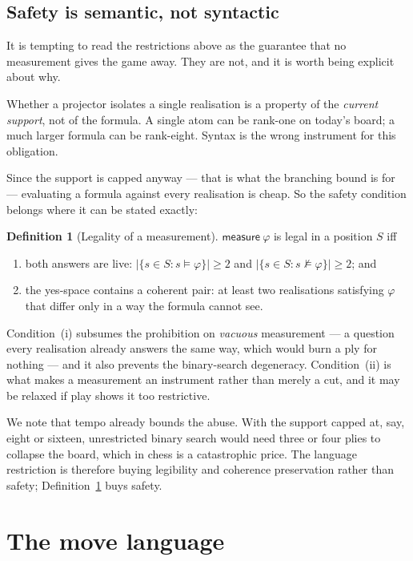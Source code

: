 \documentclass[11pt,a4paper]{article}
\theoremstyle{definition}
\newtheorem{definition}{Definition}[section]
\theoremstyle{plain}
\newcommand{\Meas}{\textsf{measure}}
\begin{document}
\subsection{Safety is semantic, not syntactic}
\label{sec:obs:safety}

It is tempting to read the restrictions above as the guarantee that no
measurement gives the game away. They are not, and it is worth being explicit
about why.

Whether a projector isolates a single realisation is a property of the
\emph{current support}, not of the formula. A single atom can be rank-one on
today's board; a much larger formula can be rank-eight. Syntax is the wrong
instrument for this obligation.

Since the support is capped anyway --- that is what the branching bound is for
--- evaluating a formula against every realisation is cheap. So the safety
condition belongs where it can be stated exactly:

\begin{definition}[Legality of a measurement]
\label{def:meas-legal}
$\Meas\ \varphi$ is legal in a position $S$ iff
\begin{enumerate}[label=(\roman*),leftmargin=2em]
\item both answers are live: $|\{s\in S: s\models\varphi\}|\ge 2$ and
      $|\{s\in S: s\not\models\varphi\}|\ge 2$; and
\item the yes-space contains a coherent pair: at least two realisations
      satisfying $\varphi$ that differ only in a way the formula cannot see.
\end{enumerate}
\end{definition}

Condition~(i) subsumes the prohibition on \emph{vacuous} measurement --- a
question every realisation already answers the same way, which would burn a ply
for nothing --- and it also prevents the binary-search degeneracy.
Condition~(ii) is what makes a measurement an instrument rather than merely a
cut, and it may be relaxed if play shows it too restrictive.

We note that tempo already bounds the abuse. With the support capped at, say,
eight or sixteen, unrestricted binary search would need three or four plies to
collapse the board, which in chess is a catastrophic price. The language
restriction is therefore buying legibility and coherence preservation rather
than safety; Definition~\ref{def:meas-legal} buys safety.

\section{The move language}
\label{sec:moves}
\end{document}
